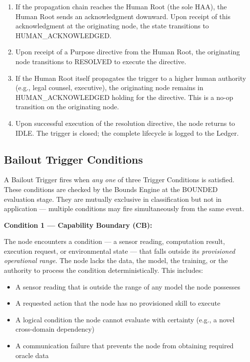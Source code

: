 \begin{enumerate}
  \item[\textbf{$T(\text{ESCALATING}, \text{HUMAN\_ROOT\_REACHED}) = \text{HUMAN\_ACKNOWLEDGED}$}] If the propagation chain reaches the Human Root (the sole HAA), the Human Root sends an acknowledgment downward. Upon receipt of this acknowledgment at the originating node, the state transitions to HUMAN\_ACKNOWLEDGED.

  \item[\textbf{$T(\text{HUMAN\_ACKNOWLEDGED}, \text{DIRECTIVE\_RECEIVED}) = \text{RESOLVED}$}] Upon receipt of a Purpose directive from the Human Root, the originating node transitions to RESOLVED to execute the directive.

  \item[\textbf{$T(\text{HUMAN\_ACKNOWLEDGED}, \text{ESCALATED\_UPWARD}) = \text{HUMAN\_ACKNOWLEDGED}$}] If the Human Root itself propagates the trigger to a higher human authority (e.g., legal counsel, executive), the originating node remains in HUMAN\_ACKNOWLEDGED holding for the directive. This is a no-op transition on the originating node.

  \item[\textbf{$T(\text{RESOLVED}, \text{DIRECTIVE\_EXECUTED}) = \text{IDLE}$}] Upon successful execution of the resolution directive, the node returns to IDLE. The trigger is closed; the complete lifecycle is logged to the Ledger.
\end{enumerate}

\subsection{Bailout Trigger Conditions}
\label{sec:trigger-conditions}

A Bailout Trigger fires when \emph{any one} of three Trigger Conditions is satisfied. These conditions are checked by the Bounds Engine at the BOUNDED evaluation stage. They are mutually exclusive in classification but not in application — multiple conditions may fire simultaneously from the same event.

\medskip
\noindent\textbf{Condition 1 — Capability Boundary (CB):}

The node encounters a condition — a sensor reading, computation result, execution request, or environmental state — that falls outside its \emph{provisioned operational range}. The node lacks the data, the model, the training, or the authority to process the condition deterministically. This includes:
\begin{itemize}
  \item A sensor reading that is outside the range of any model the node possesses
  \item A requested action that the node has no provisioned skill to execute
  \item A logical condition the node cannot evaluate with certainty (e.g., a novel cross-domain dependency)
  \item A communication failure that prevents the node from obtaining required oracle data
\end{itemize}


